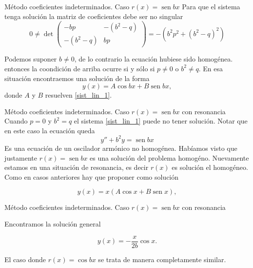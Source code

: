 \documentclass[handout,hyperref={colorlinks=true}]{beamer}
\DeclareMathOperator{\sen}{sen}
\begin{document}
 \begin{frame}{Método coeficientes indeterminados. Caso $r(x)=\sen bx$}
Para que el sistema tenga solución la matriz de coeficientes debe ser no singular
\[
  0\neq\det \begin{pmatrix}
              -bp & -(b^2-q)\\
              -(b^2-q) & bp
            \end{pmatrix} = -(b^2p^2+(b^2-q)^2)
\]

Podemos suponer $b\neq 0$, de lo contrario la ecuación hubiese sido homogénea. entonces la coondición de arriba ocurre si y sólo si 
$p\neq 0$ o $b^2\neq q$. En esa situación encontraemos una solución de la forma
\[
 \boxed{y(x)=A\cos bx + B\sen bx},
\]
donde $A$ y $B$ resuelven \eqref{sist_lin_1}.
\end{frame}



  \begin{frame}{Método coeficientes indeterminados. Caso $r(x)=\sen bx$ con resonancia}\label{eq:forz_res}
Cuando $p=0$ y $b^2= q$ el sistema \eqref{sist_lin_1} puede no tener solución. Notar que en este caso la ecuación queda
\[
 y''+b^2y=\sen bx
\]
Es una ecuación de un oscilador armónico no homogénea. Habíamos visto que justamente $r(x)=\sen bx$ es una solución del problema homogéno. Nuevamente
estamos en una situación de resonancia, es decir $r(x)$ es solución el homogéneo.  Como en casos anteriores hay que proponer como solución

 \[y(x)=x\left(A\cos x+ B\sen x\right),\]
\end{frame}


   \begin{frame}{Método coeficientes indeterminados. Caso $r(x)=\sen bx$ con resonancia}
 \lstI
 
 Encontramos la solución general
 
  \[\boxed{y(x)=-\frac{x}{2b}\cos x}.\]
 
El caso donde $r(x)=\cos bx$ se trata de manera completamente similar.

\end{frame}
\end{document}
